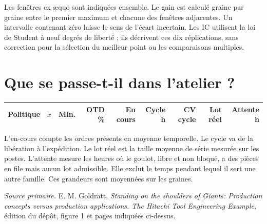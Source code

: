 \documentclass[10pt,a4paper]{article}
\begin{document}
Les fenêtres ex æquo sont indiquées ensemble. Le gain est calculé graine par
graine entre le premier maximum et chacune des fenêtres adjacentes. Un intervalle
contenant zéro laisse le sens de l'écart incertain. Les IC utilisent la loi de
Student à neuf degrés de liberté ; ils décrivent ces dix réplications, sans
correction pour la sélection du meilleur point ou les comparaisons multiples.

\section*{Que se passe-t-il dans l'atelier ?}
\small
\begin{tabular}{lrrrrrrrr}\toprule
Politique & $x$ & Min. & OTD \% & En cours & Cycle h & CV cycle & Lot réel & Attente h\\\midrule

\end{tabular}
\normalsize

L'en-cours compte les ordres présents en moyenne temporelle. Le cycle va de la
libération à l'expédition. Le lot réel est la taille moyenne de série mesurée
sur les postes. L'attente mesure les heures où le goulot, libre et non bloqué,
a des pièces en file mais aucun lot admissible. Elle exclut le temps pendant
lequel il sert une autre famille. Ces grandeurs sont moyennées sur les graines.



\small\textit{Source primaire.} E. M. Goldratt, \emph{Standing on the shoulders
of Giants: Production concepts versus production applications. The Hitachi Tool
Engineering Example}, édition du dépôt, figure 1 et pages indiquées ci-dessus.
\end{document}
